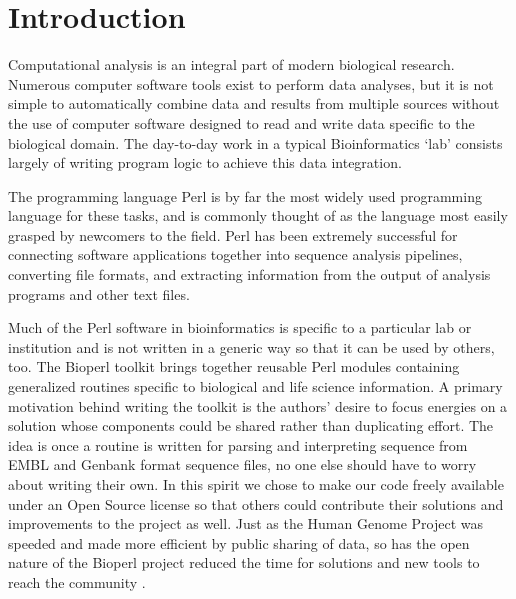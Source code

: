 \documentclass[12pt]{article}
\begin{document}
\section{Introduction}

Computational analysis is an integral part of modern biological
research.  Numerous computer software tools exist to perform data
analyses, but it is not simple to automatically combine data and
results from multiple sources without the use of computer software
designed to read and write data specific to the biological domain.
The day-to-day work in a typical Bioinformatics `lab' consists largely of
writing program logic to achieve this data integration.

The programming language Perl \cite{perlref} is by far the most widely used
programming language for these tasks, and is commonly thought of as
the language most easily grasped by newcomers to the field.  Perl has
been extremely successful for connecting software applications together into
sequence analysis pipelines, converting file formats, and extracting
information from the output of analysis programs and other text files.

Much of the Perl software in bioinformatics is specific to a
particular lab or institution and is not written in a generic way so
that it can be used by others, too.  The Bioperl toolkit brings
together reusable Perl modules containing generalized routines
specific to biological and life science information.  A primary
motivation behind writing the toolkit is the authors' desire to focus
energies on a solution whose components could be shared rather than
duplicating effort.  The idea is once a routine is written for
parsing and interpreting sequence from EMBL and Genbank format
sequence files, no one else should have to worry about writing their
own.  In this spirit we chose to make our code freely available under
an Open Source\cite{open-sourc-ref} license so that others could
contribute their solutions and improvements to the project as well.
Just as the Human Genome Project was speeded and made more efficient
by public sharing of data, so has the open nature of the Bioperl
project reduced the time for solutions and new tools to reach the
community \cite{waterston}.
\end{document}
